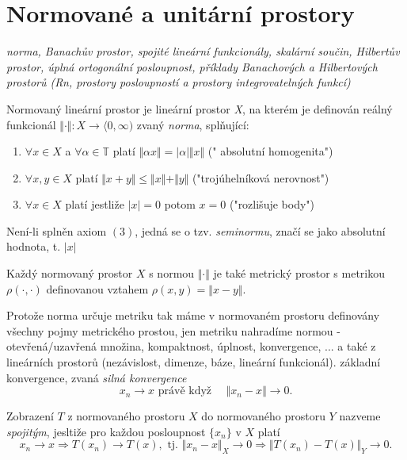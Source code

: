 \section{Normované a unitární prostory}
\textit{norma, Banachův prostor, spojité lineární funkcionály, skalární součin, Hilbertův prostor, úplná ortogonální posloupnost, příklady Banachových a Hilbertových prostorů (Rn, prostory posloupností a prostory integrovatelných funkcí)}
\\
\begin{definition}
Normovaný lineární prostor je lineární prostor \textit{X}, na kterém je definován reálný funkcionál $\Vert\cdot\Vert : X \rightarrow \langle 0,\infty )$ zvaný \textit{norma}, splňující:
\begin{enumerate}
\item  $\forall x \in X$ a $ \forall \alpha \in \mathbb{T}$ platí $  \Vert \alpha x \Vert = \vert \alpha \vert \Vert x \Vert$ (" absolutní homogenita")
\item $\forall x,y \in X $ platí $ \Vert x+y \Vert \leq \Vert x \Vert + \Vert y \Vert$ ("trojúhelníková nerovnost") 
\item $\forall x \in X$ platí jestliže $\vert x \vert =0$ potom $x=0$  ("rozlišuje body")
\end{enumerate}
Není-li splněn axiom $(3)$, jedná se o tzv. \textit{seminormu}, značí se jako absolutní hodnota, t. $\vert x \vert$ 
\end{definition}

\begin{theorem}
Každý normovaný prostor $X$ s normou $\Vert \cdot \Vert $ je také metrický prostor s metrikou $\rho(\cdot,\cdot)$ definovanou vztahem $\rho (x,y)= \Vert x-y \Vert$. 
\end{theorem}

\begin{notes}
Protože norma určuje metriku tak máme v normovaném prostoru definovány všechny pojmy metrického prostou, jen metriku nahradíme normou - otevřená/uzavřená množina, kompaktnost, úplnost, konvergence, ... a také z lineárních prostorů (nezávislost, dimenze, báze, lineární funkcionál).  základní konvergence, zvaná \textit{silná konvergence }
\begin{equation*}
	x_n \rightarrow x \text{  právě když } \quad \Vert x_n-x\Vert \rightarrow 0.
\end{equation*}
\end{notes}

\begin{definition}
	Zobrazení $T$ z normovaného prostoru $X$ do normovaného prostoru $Y$ nazveme \textit{spojitým}, jesltiže pro každou posloupnost $\{x_n \}$ v $X$ platí
	\begin{equation*}
		x_n\rightarrow x \Rightarrow T(x_n)\rightarrow T(x), \text{   tj.  } \Vert x_n -x \Vert_X \rightarrow 0 \Rightarrow \Vert T(x_n) - T(x)\Vert_Y \rightarrow 0.
	\end{equation*} 
\end{definition}


